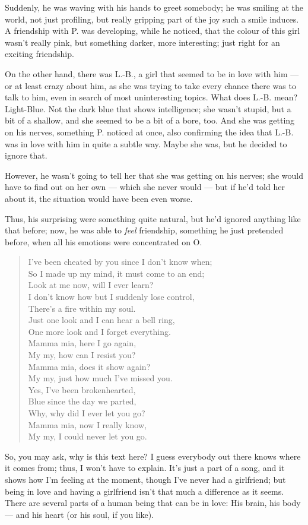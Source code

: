 Suddenly, he was waving with his hands to greet somebody; he was smiling at the world, not just profiling, but really gripping part of the joy such a smile induces. A friendship with P. was developing, while he noticed, that the colour of this girl wasn't really pink, but something darker, more interesting; just right for an exciting friendship.

On the other hand, there was L.-B., a girl that seemed to be in love with him --- or at least crazy about him, as she was trying to take every chance there was to talk to him, even in search of most uninteresting topics. 
What does L.-B. mean? Light-Blue. Not the dark blue that shows intelligence; she wasn't stupid, but a bit of a shallow, and she seemed to be a bit of a bore, too. 
And she was getting on his nerves, something P. noticed at once, also confirming the idea that L.-B. was in love with him in quite a subtle way. 
Maybe she was, but he decided to ignore that.

However, he wasn't going to tell her that she was getting on his nerves; she would have to find out on her own --- which she never would --- but if he'd told her about it, the situation would have been even worse.

Thus, his surprising were something quite natural, but he'd ignored anything like that before; now, he was able to \emph{feel} friendship, something he just pretended before, when all his emotions were concentrated on O. 
\begin{quote}
I've been cheated by you since I don't know when;\\
So I made up my mind, it must come to an end;\\
Look at me now, will I ever learn? \\
I don't know how but I suddenly lose control,\\
There's a fire within my soul. \\
Just one look and I can hear a bell ring,\\
One more look and I forget everything. \\

Mamma mia, here I go again,\\
My my, how can I resist you? \\
Mamma mia, does it show again?\\
My my, just how much I've missed you. \\
Yes, I've been brokenhearted, \\
Blue since the day we parted, \\
Why, why did I ever let you go? \\
Mamma mia, now I really know,\\
My my, I could never let you go.
\end{quote}
So, you may ask, why is this text here? I guess everybody out there knows where it comes from; thus, I won't have to explain. 
It's just a part of a song, and it shows how I'm feeling at the moment, though I've never had a girlfriend; but being in love and having a girlfriend isn't that much a difference as it seems. There are several parts of a human being that can be in love: His brain, his body --- and his heart (or his soul, if you like).

